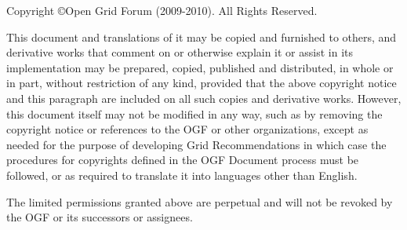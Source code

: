 Copyright \copyright Open Grid Forum (2009-2010). All Rights Reserved.

This document and translations of it may be copied and furnished to
others, and derivative works that comment on or otherwise explain it
or assist in its implementation may be prepared, copied, published and
distributed, in whole or in part, without restriction of any kind,
provided that the above copyright notice and this paragraph are
included on all such copies and derivative works. However, this
document itself may not be modified in any way, such as by removing
the copyright notice or references to the OGF or other organizations,
except as needed for the purpose of developing Grid Recommendations in
which case the procedures for copyrights defined in the OGF Document
process must be followed, or as required to translate it into
languages other than English.

The limited permissions granted above are perpetual and will not be
revoked by the OGF or its successors or assignees.

